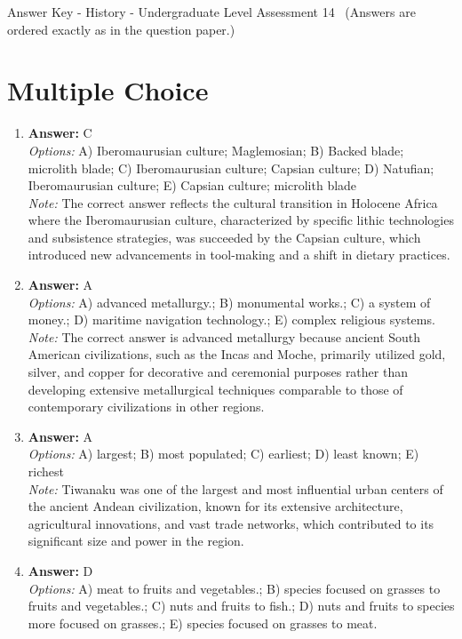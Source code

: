 \documentclass[12pt]{article}
\begin{document}
\begin{center}
Answer Key - History - Undergraduate Level Assessment 14 \
\small (Answers are ordered exactly as in the question paper.)
\end{center}

\section*{Multiple Choice}
\begin{enumerate}[label=\arabic*.]
\item \textbf{Answer:} C
\\ \textit{Options:} A) Iberomaurusian culture; Maglemosian; B) Backed blade; microlith blade; C) Iberomaurusian culture; Capsian culture; D) Natufian; Iberomaurusian culture; E) Capsian culture; microlith blade
\\ \textit{Note:} The correct answer reflects the cultural transition in Holocene Africa where the Iberomaurusian culture, characterized by specific lithic technologies and subsistence strategies, was succeeded by the Capsian culture, which introduced new advancements in tool-making and a shift in dietary practices.
\item \textbf{Answer:} A
\\ \textit{Options:} A) advanced metallurgy.; B) monumental works.; C) a system of money.; D) maritime navigation technology.; E) complex religious systems.
\\ \textit{Note:} The correct answer is advanced metallurgy because ancient South American civilizations, such as the Incas and Moche, primarily utilized gold, silver, and copper for decorative and ceremonial purposes rather than developing extensive metallurgical techniques comparable to those of contemporary civilizations in other regions.
\item \textbf{Answer:} A
\\ \textit{Options:} A) largest; B) most populated; C) earliest; D) least known; E) richest
\\ \textit{Note:} Tiwanaku was one of the largest and most influential urban centers of the ancient Andean civilization, known for its extensive architecture, agricultural innovations, and vast trade networks, which contributed to its significant size and power in the region.
\item \textbf{Answer:} D
\\ \textit{Options:} A) meat to fruits and vegetables.; B) species focused on grasses to fruits and vegetables.; C) nuts and fruits to fish.; D) nuts and fruits to species more focused on grasses.; E) species focused on grasses to meat.

\end{enumerate}
\end{document}
